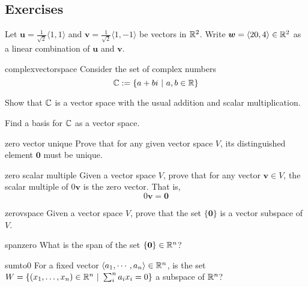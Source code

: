 \subsection{Exercises}
    
    \begin{problem}
    Let $\bm{u} = \frac{1}{\sqrt{2}}\langle 1, 1 \rangle$ and $\bm{v} = \frac{1}{\sqrt{2}}\langle 1, -1 \rangle$ be vectors in $\mathbb{R}^2$.  Write $\bm{w} = \langle 20, 4 \rangle \in \mathbb{R}^2$ as a linear combination of $\bm{u}$ and $\bm{v}$.
    \end{problem}
    
    \begin{problem}{complexvectorspace}
Consider the set of complex numbers $$\mathbb{C} := \{ a + bi \ | \ a, b \in \mathbb{R}\}$$ 

\begin{subproblems}
\item Show that $\mathbb{C}$ is a vector space with the usual addition and scalar multiplication.
\item Find a basis for $\mathbb{C}$ as a vector space.
\end{subproblems}

\end{problem}

\begin{problem}{zero vector unique}
Prove that for any given vector space $V$, its distinguished element $\bm{0}$ must be unique.
\end{problem}

\begin{problem}{zero scalar multiple}
Given a vector space $V$, prove that for any vector $\bm{v} \in V$, the scalar multiple of $0\bm{v}$ is the zero vector.  That is,
$$0\bm{v} = \bm{0}$$
\end{problem}

\begin{problem}{zerovspace}
Given a vector space $V$, prove that the set $\{\bm{0}\}$ is a vector subspace of $V$.
\end{problem}

\begin{problem}{spanzero}
    What is the span of the set $\{\bm{0}\} \in \mathbb{R}^n$?
\end{problem}


\begin{problem}{sumto0}
For a fixed vector $\langle a_1, \cdots, a_n \rangle \in \mathbb{R}^n$, is the set $W = \{(x_1, \dots, x_n) \in \R^n \ | \ \sum^n_i a_ix_i = 0 \}$ a subspace of $\mathbb{R}^n$?
\end{problem}

